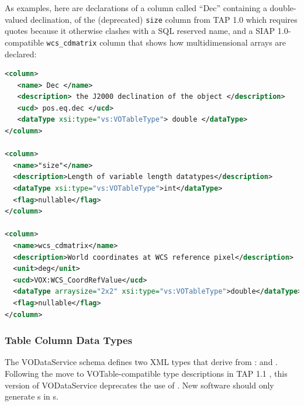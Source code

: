 \documentclass[11pt,a4paper]{ivoa}
\begin{document}
As examples, here are declarations of a column called ``Dec'' containing
a double-valued declination, of the (deprecated) \verb|size| column
from TAP 1.0 which requires quotes because it otherwise clashes with a
SQL reserved name, and a SIAP 1.0-compatible \verb|wcs_cdmatrix|
column that shows how multidimensional arrays are declared:

\begin{lstlisting}[language=XML,basicstyle=\footnotesize]
<column>
   <name> Dec </name>
   <description> the J2000 declination of the object </description>
   <ucd> pos.eq.dec </ucd>
   <dataType xsi:type="vs:VOTableType"> double </dataType>
</column>

<column>
  <name>"size"</name>
  <description>Length of variable length datatypes</description>
  <dataType xsi:type="vs:VOTableType">int</dataType>
  <flag>nullable</flag>
</column>

<column>
  <name>wcs_cdmatrix</name>
  <description>World coordinates at WCS reference pixel</description>
  <unit>deg</unit>
  <ucd>VOX:WCS_CoordRefValue</ucd>
  <dataType arraysize="2x2" xsi:type="vs:VOTableType">double</dataType>
  <flag>nullable</flag>
</column>
\end{lstlisting}


\subsubsection{Table Column Data Types}
\label{sect:tbldatatypes}


The VODataService schema defines two XML types that derive from
:   and
.  Following the move to VOTable-compatible type
descriptions in TAP 1.1 \citep{todo:TAP1.1}, this version of
VODataService deprecates the use of .  New software
should only generate s in s.
\end{document}
